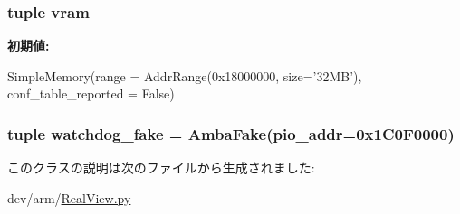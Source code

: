 \label{classRealView_1_1VExpress__EMM_a766044c2ee00b062946f8144e20427c5}
\hypertarget{classRealView_1_1VExpress__EMM_a71ad21f3a308e0e8282dc83cf80351eb}{
\subsubsection[{vram}]{\setlength{\rightskip}{0pt plus 5cm}tuple {\bf vram}}}
\label{classRealView_1_1VExpress__EMM_a71ad21f3a308e0e8282dc83cf80351eb}
{\bfseries 初期値:}
\begin{DoxyCode}
SimpleMemory(range = AddrRange(0x18000000, size='32MB'),
                                  conf_table_reported = False)
\end{DoxyCode}
\hypertarget{classRealView_1_1VExpress__EMM_a6dfafd229651b87c734e8433a613a8a4}{
\subsubsection[{watchdog\_\-fake}]{\setlength{\rightskip}{0pt plus 5cm}tuple {\bf watchdog\_\-fake} = {\bf AmbaFake}(pio\_\-addr=0x1C0F0000)}}
\label{classRealView_1_1VExpress__EMM_a6dfafd229651b87c734e8433a613a8a4}


このクラスの説明は次のファイルから生成されました:\begin{DoxyCompactItemize}
\item 
dev/arm/\hyperlink{RealView_8py}{RealView.py}\end{DoxyCompactItemize}
